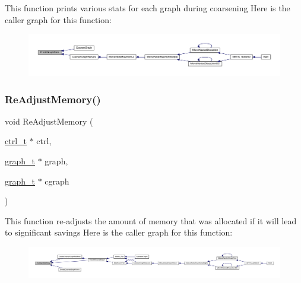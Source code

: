 This function prints various stats for each graph during coarsening Here is the caller graph for this function\+:\nopagebreak
\begin{figure}[H]
\begin{center}
\leavevmode
\includegraphics[width=350pt]{a00182_aac3e480e7e3bd02bfdf001d858a93562_icgraph}
\end{center}
\end{figure}
\mbox{\label{a00182_ab69ab96ec78174da232dff05e9c79d2f}} 
\subsubsection{\texorpdfstring{Re\+Adjust\+Memory()}{ReAdjustMemory()}}
{\footnotesize\ttfamily void Re\+Adjust\+Memory (\begin{DoxyParamCaption}\item[{\hyperlink{a00742}{ctrl\+\_\+t} $\ast$}]{ctrl,  }\item[{\hyperlink{a00734}{graph\+\_\+t} $\ast$}]{graph,  }\item[{\hyperlink{a00734}{graph\+\_\+t} $\ast$}]{cgraph }\end{DoxyParamCaption})}

This function re-\/adjusts the amount of memory that was allocated if it will lead to significant savings Here is the caller graph for this function\+:\nopagebreak
\begin{figure}[H]
\begin{center}
\leavevmode
\includegraphics[width=350pt]{a00182_ab69ab96ec78174da232dff05e9c79d2f_icgraph}
\end{center}
\end{figure}
\mbox{\label{a00182_a113522304bf628b09d0b69b4db05050e}} 
